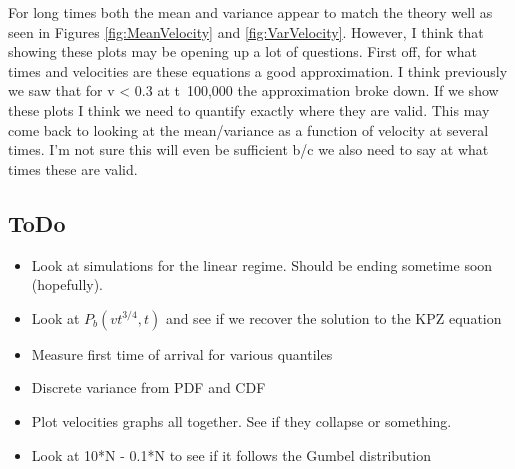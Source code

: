 \documentclass{article}
\begin{document}
\indent For long times both the mean and variance appear to match the theory well as seen in Figures \ref{fig:MeanVelocity} and \ref {fig:VarVelocity}. However, I think that showing these plots may be opening up a lot of questions. First off, for what times and velocities are these equations a good approximation. I think previously we saw that for v < 0.3 at t~100,000 the approximation broke down. If we show these plots I think we need to quantify exactly where they are valid. This may come back to looking at the mean/variance as a function of velocity at several times. I'm not sure this will even be sufficient b/c we also need to say at what times these are valid.

\subsection{ToDo}

\begin{itemize}
	\item Look at simulations for the linear regime. Should be ending sometime soon (hopefully).
	\item Look at $P_{b}(vt^{3/4}, t)$ and see if we recover the solution to the KPZ equation
	\item Measure first time of arrival for various quantiles
	\item Discrete variance from PDF and CDF
	\item Plot velocities graphs all together. See if they collapse or something.
  \item Look at 10*N - 0.1*N to see if it follows the Gumbel distribution
\end{itemize}
\end{document}
